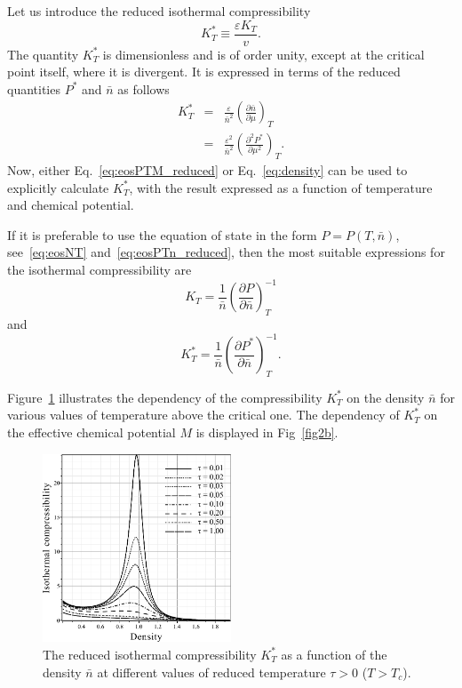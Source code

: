 Let us introduce the reduced isothermal compressibility
\begin{equation}
	K^*_T \equiv \frac{\varepsilon K_T}{v}.
\end{equation}
The quantity $K^*_T$ is dimensionless and is of order unity, except at the critical point itself, where it is divergent. It is expressed in terms of the reduced quantities $P^*$ and $\bar{n}$ as follows
\begin{eqnarray}
	K^*_T & = & \frac{\varepsilon}{\bar{n}^2} \left(\frac{\partial \bar{n}}{\partial \mu}\right)_T
	\nonumber\\
	& = & \frac{\varepsilon^2}{\bar{n}^2} \left(\frac{\partial^2 P^*}{\partial \mu^2}\right)_T.
\end{eqnarray}
Now, either Eq.~\eqref{eq:eosPTM_reduced} or Eq.~\eqref{eq:density} can be used to explicitly calculate $K^*_T$, with the result expressed as a function of temperature and chemical potential.

If it is preferable to use the equation of state in the form $P=P(T, \bar{n})$, see~\eqref{eq:eosNT} and~\eqref{eq:eosPTn_reduced}, then the most suitable expressions for the isothermal compressibility are
\begin{equation}
	K_T = \frac{1}{\bar{n}} \left(\frac{\partial P}{\partial \bar{n}}\right)^{-1}_T
\end{equation}
and 
\begin{equation}
	K^*_T = \frac{1}{\bar{n}} \left(\frac{\partial P^*}{\partial \bar{n}}\right)^{-1}_T.
\end{equation}

Figure~\ref{fig2a} illustrates the dependency of the compressibility $K^*_T$ on the density $\bar{n}$ for various values of temperature above the critical one. The dependency of $K^*_T$ on the effective chemical potential $M$ is displayed in Fig~\ref{fig2b}.

\begin{figure}[htbp]
	\includegraphics[width=0.5\textwidth]{f2a.pdf}
	\caption{The reduced isothermal compressibility $K^*_T$ as a function of the density $\bar n$ at different values of reduced temperature $\tau > 0$ ($T > T_c$). 
	}
	\label{fig2a}
\end{figure}

